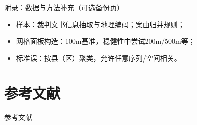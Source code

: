 \documentclass[aspectratio=169,10pt]{ctexbeamer}
\begin{document}
\appendix

\begin{frame}{附录：数据与方法补充（可选备份页）}
  \begin{itemize}
    \item 样本：裁判文书信息抽取与地理编码；案由归并规则；
    \item 网格面板构造：100m基准，稳健性中尝试200m/500m等；
    \item 标准误：按县（区）聚类，允许任意序列/空间相关。
  \end{itemize}
\end{frame}

\section{参考文献}
\begin{frame}[allowframebreaks]{参考文献}
  \scriptsize
  \printbibliography
\end{frame}
\end{document}
